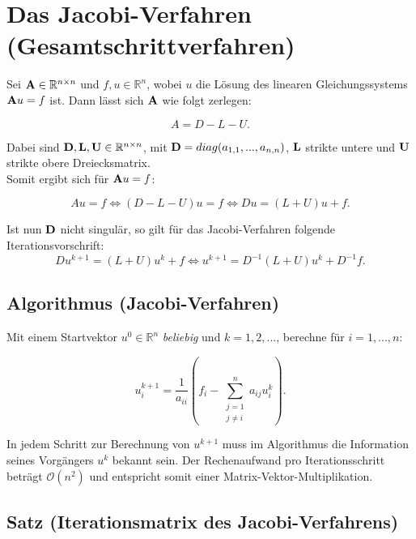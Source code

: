 \section{Das Jacobi-Verfahren (Gesamtschrittverfahren)}\label{s.Das Jacobi-Iterationsverfahren}

Sei ${\textbf{A}} \in \mathbb{R}^{n \times n}$ und $f,u \in \mathbb{R}^{n}$, wobei $u$ die Lösung des linearen Gleichungssystems ${\textbf{A}}u = f$ ist. Dann lässt sich ${\textbf{A}}$ wie folgt zerlegen:

\begin{equation}
A = D - L - U.
\end{equation}

Dabei sind ${\textbf{D}},{\textbf{L}},{\textbf{U}} \in \mathbb{R}^{n \times n}$, mit ${\textbf{D}} = diag(a_{1,1},...,a_{n,n})$, ${\textbf{L}}$ strikte untere und ${\textbf{U}}$ strikte obere Dreiecksmatrix. \\
Somit ergibt sich für ${\textbf{A}}u = f$:

\begin{equation}
Au = f \Leftrightarrow (D-L-U)u = f \Leftrightarrow Du = (L+U)u + f.
\end{equation}

Ist nun ${\textbf{D}}$ nicht singulär, so gilt für das Jacobi-Verfahren folgende Iterationsvorschrift:
\begin{equation}
Du^{k+1} = (L+U)u^{k} + f \Leftrightarrow u^{k+1} = D^{-1}(L+U)u^{k} + D^{-1}f.
\end{equation}

\subsection{Algorithmus (Jacobi-Verfahren)}\label{ss.Allgemeines Jacobi-Verfahren}
Mit einem Startvektor $u^{0} \in \mathbb{R}^{n}$ \textit{beliebig} und $k=1,2,...$, berechne für $i=1,...,n$:

\begin{equation}
u^{k+1}_{i} = \frac {1} {a_{ii}} (f_{i} - \sum_{\substack{j = 1 \\ j \ne i}}^{n} a_{ij}u^{k}_{i}).
\end{equation}

In jedem Schritt zur Berechnung von $u^{k+1}$ muss im Algorithmus die Information seines Vorgängers $u^{k}$ bekannt sein. Der Rechenaufwand pro Iterationsschritt beträgt $\mathcal{O}(n^{2})$ und entspricht somit einer Matrix-Vektor-Multiplikation.

\subsection{Satz (Iterationsmatrix des Jacobi-Verfahrens)}\label{ss.Iterationsmatrix Jacobi}

